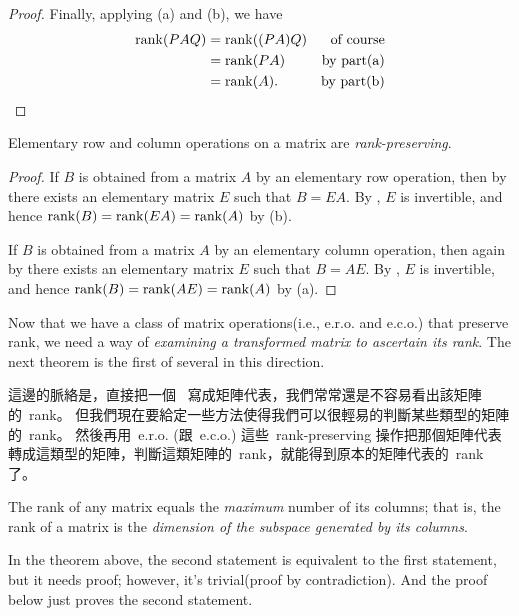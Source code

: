 \begin{proof}
Finally, applying (a) and (b), we have
\begin{align*}
    \mathrm{rank}(PAQ) & = \mathrm{rank}((PA)Q) & \text{of course} \\
               & = \mathrm{rank}(PA) & \text{by part(a)} \\
               & = \mathrm{rank}(A). & \text{by part(b)}
\end{align*}
\end{proof}

\begin{corollary} \label{corollary 3.4.1}
Elementary row and column operations on a matrix are \emph{rank-preserving}.
\end{corollary}

\begin{proof}
If \(B\) is obtained from a matrix \(A\) by an elementary row operation, then by  there exists an elementary matrix \(E\) such that \(B = EA\).
By , \(E\) is invertible, and hence \(\mathrm{rank}(B) = \mathrm{rank}(EA) = \mathrm{rank}(A)\) by (b).

If \(B\) is obtained from a matrix \(A\) by an elementary column operation, then again by  there exists an elementary matrix \(E\) such that \(B = AE\).
By , \(E\) is invertible, and hence \(\mathrm{rank}(B) = \mathrm{rank}(AE) = \mathrm{rank}(A)\) by (a).
\end{proof}

Now that we have a class of matrix operations(i.e., e.r.o. and e.c.o.) that preserve rank, we need a way of \emph{examining a transformed matrix to ascertain its rank}.
The next theorem is the first of several in this direction.

\begin{note}
這邊的脈絡是，直接把一個\ \LTRAN{} 寫成矩陣代表，我們常常還是不容易看出該矩陣的\ rank。
但我們現在要給定一些方法使得我們可以很輕易的判斷某些類型的矩陣的\ rank。
然後再用\ e.r.o. (跟\ e.c.o.) 這些\ rank-preserving 操作把那個矩陣代表轉成這類型的矩陣，判斷這類矩陣的\ rank，就能得到原本的矩陣代表的\ rank 了。
\end{note}

\begin{theorem} \label{thm 3.5}
The rank of any matrix equals the \emph{maximum} number of its \emph{\LID{}} columns;
that is, the rank of a matrix is the \emph{dimension of the subspace generated by its columns}.
\end{theorem}

\begin{note}
In the theorem above, the second statement is equivalent to the first statement, but it needs proof;
however, it's trivial(proof by contradiction).
And the proof below just proves the second statement.
\end{note}

